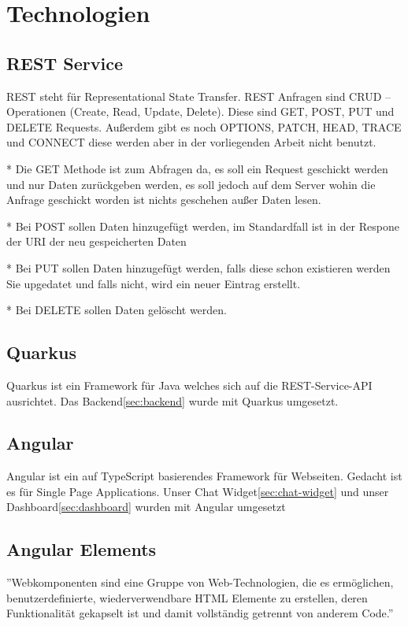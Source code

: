 \section{Technologien}

\subsection{REST Service}
REST steht für Representational State Transfer.
REST Anfragen sind CRUD – Operationen (Create, Read, Update, Delete).
Diese sind GET, POST, PUT und DELETE Requests.
Außerdem gibt es noch OPTIONS, PATCH, HEAD, TRACE
und CONNECT diese werden aber in der vorliegenden Arbeit nicht benutzt.

* Die GET Methode ist zum Abfragen da, es soll ein Request geschickt werden und nur Daten zurückgeben werden, es soll jedoch auf dem Server wohin die Anfrage geschickt worden ist nichts geschehen außer Daten lesen.

* Bei POST sollen Daten hinzugefügt werden, im Standardfall ist in der Respone der URI der neu gespeicherten Daten

* Bei PUT sollen Daten hinzugefügt werden, falls diese schon existieren werden Sie upgedatet und falls nicht, wird ein neuer Eintrag erstellt.

* Bei DELETE sollen Daten gelöscht werden.

\subsection{Quarkus}\label{quarkus}
Quarkus ist ein Framework für Java welches sich auf die REST-Service-API ausrichtet.
Das Backend\ref{sec:backend} wurde mit Quarkus umgesetzt.

\subsection{Angular}
Angular ist ein auf TypeScript basierendes Framework für Webseiten.
Gedacht ist es für Single Page Applications.
Unser Chat Widget\ref{sec:chat-widget} und unser Dashboard\ref{sec:dashboard} wurden mit Angular umgesetzt

\subsection{Angular Elements}
''Webkomponenten sind eine Gruppe von Web-Technologien, die es ermöglichen, benutzerdefinierte, wiederverwendbare HTML Elemente zu erstellen, deren Funktionalität gekapselt ist und damit vollständig getrennt von anderem Code.''\cite{webcomponents}

